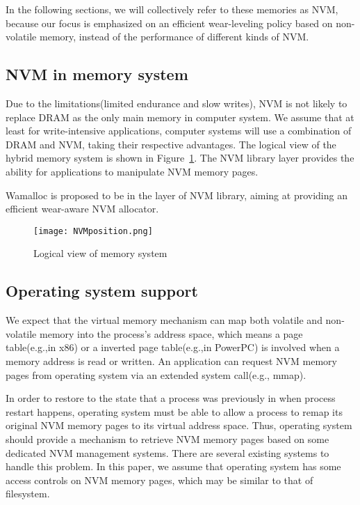 \documentclass[10pt, conference, compsocconf]{IEEEtran}
\begin{document}
In the following sections, we will collectively refer to these memories as NVM, 
because our focus is emphasized on an efficient wear-leveling policy based on non-volatile memory,
instead of the performance of different kinds of NVM.

\subsection{NVM in memory system}

Due to the limitations(limited endurance and slow writes),
NVM is not likely to replace DRAM as the only main memory in computer system.
We assume that at least for write-intensive applications,
computer systems will use a combination of DRAM and NVM, taking their respective advantages.
The logical view of the hybrid memory system is shown in Figure~\ref{fig:NVMposition}.
The NVM library layer provides the ability for applications to manipulate NVM memory pages.

Wamalloc is proposed to be in the layer of NVM library, aiming at providing an efficient wear-aware NVM allocator.

\begin{figure}[h]
\centering
\texttt{[image: NVMposition.png]}
\caption{Logical view of memory system}
\label{fig:NVMposition}
\end{figure}

\subsection{Operating system support}

We expect that the virtual memory mechanism can map both volatile and non-volatile memory into the process's address space,
which means a page table(e.g.,in x86) or a inverted page table(e.g.,in PowerPC) is involved when a memory address is read or written.
An application can request NVM memory pages from operating system via an extended system call(e.g., mmap).

In order to restore to the state that a process was previously in when process restart happens, 
operating system must be able to allow a process to remap its original NVM memory pages to its virtual address space.
Thus, operating system should provide a mechanism to retrieve NVM memory pages based on some dedicated NVM management systems.
There are several existing systems to handle this problem\cite{coburn2011nv, satyanarayanan1994lightweight, volos2011mnemosyne}.
In this paper, we assume that operating system has some access controls on NVM memory pages, 
which may be similar to that of filesystem.
\end{document}
